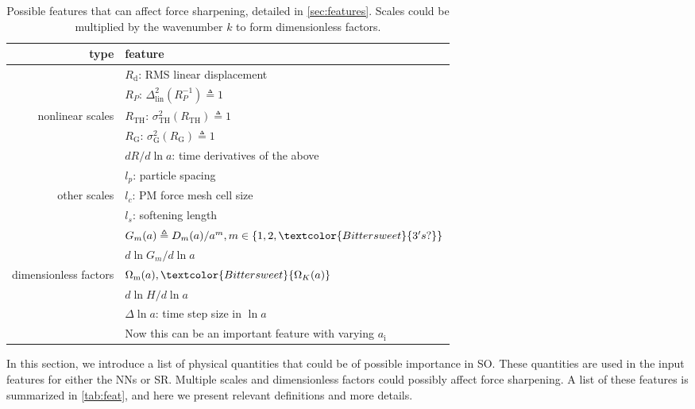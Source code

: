 \documentclass[modern, trackchanges, dvipsnames]{aastex631}
\renewcommand{\d}{d}
\newcommand{\lna}{\ln\!a}
\newcommand{\Omegam}{\Omega_\mathrm{m}}
\newcommand{\OmegaK}{\Omega_K}
\newcommand{\ic}{\mathrm{i}}
\newcommand{\linear}{\mathrm{lin}}
\newcommand{\tophat}{\mathrm{TH}}
\newcommand{\gauss}{\mathrm{G}}
\newcommand{\YL}[1]{\textcolor{Bittersweet}{#1}}
\begin{document}
\begin{table}
  \centering
  \caption{Possible features that can affect force sharpening, detailed
  in \autoref{sec:features}. Scales could be multiplied by the
  wavenumber $k$ to form dimensionless factors.}
  \label{tab:feat}
  \begin{tabular}{rl}
  \toprule
  type & feature \\
  \midrule
  & $R_\mathrm{d}$: RMS linear displacement \\
  \cmidrule(lr){2-2}
  & $R_P$: $\Delta_\linear^2(R_P^{-1}) \triangleq 1$ \\
  \cmidrule(lr){2-2}
  nonlinear scales & $R_\tophat$: $\sigma_\tophat^2(R_\tophat) \triangleq 1$ \\
  \cmidrule(lr){2-2}
  & $R_\gauss$: $\sigma_\gauss^2(R_\gauss) \triangleq 1$ \\
  \cmidrule(lr){2-2}
  & $\d R / \d\lna$: time derivatives of the above \\
  \midrule
  & $l_p$: particle spacing \\
  \cmidrule(lr){2-2}
  other scales & $l_c$: PM force mesh cell size \\
  \cmidrule(lr){2-2}
  & $l_s$: softening length \\
  \midrule
  & $G_m(a) \triangleq D_m(a) / a^m, m \in \{1, 2, \YL{3's?}\}$ \\
  \cmidrule(lr){2-2}
  & $\d\ln G_m / \d\lna$ \\
  \cmidrule(lr){2-2}
  dimensionless factors & $\Omegam(a), \YL{\OmegaK(a)}$ \\
  \cmidrule(lr){2-2}
  & $\d\ln\!H / \d\lna$ \\
  \cmidrule(lr){2-2}
  & $\Delta\lna$: time step size in $\lna$ \\
  & \YL{Now this can be an important feature with varying $a_\ic$} \\
  \bottomrule
  \end{tabular}
  \end{table}

In this section, we introduce a list of physical quantities that could
be of possible importance in SO.
These quantities are used in the input features for either the NNs or
SR.
Multiple scales and dimensionless factors could possibly affect force
sharpening.
A list of these features is summarized in \autoref{tab:feat}, and here
we present relevant definitions and more details.
\end{document}
